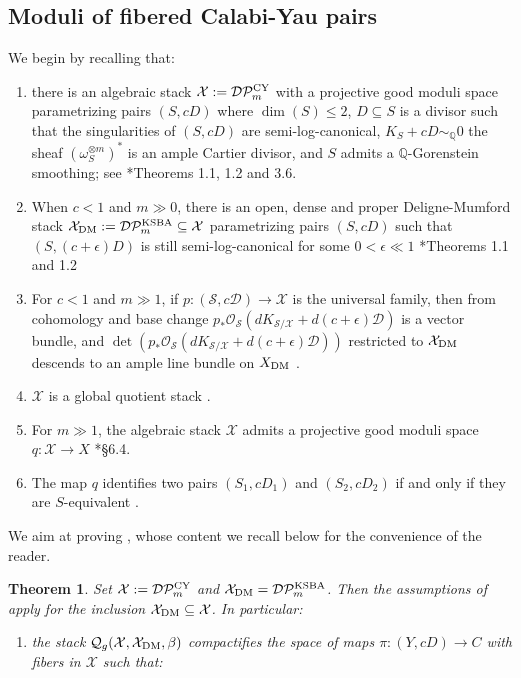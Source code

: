 \documentclass{amsart}
\newcommand{\bQ}{\mathbb{Q}}
\newcommand{\sD}{\mathscr{D}}
\newcommand{\sS}{\mathscr{S}}
\newcommand{\cD}{\mathcal{D}}
\newcommand{\cO}{\mathcal{O}}
\newcommand{\cP}{\mathcal{P}}
\newcommand{\cQ}{\mathcal{Q}}
\newcommand{\cS}{\mathcal{S}}
\newcommand{\cX}{\mathcal{X}}
\newcommand{\dm}{{\rm DM}}
\newcommand{\CY}{{\rm CY}}
\newtheorem{Teo}[theorem]{Theorem}
\theoremstyle{definition}
\theoremstyle{definition}
\begin{document}
{\subsection{Moduli of fibered Calabi-Yau pairs}
We begin by recalling that:
\begin{enumerate}
    \item there is an algebraic stack $\cX:=\cD\cP_m^{\CY}$ with a projective good moduli space parametrizing pairs $(S,cD)$ where $\dim(S)\le 2$, $D\subseteq S$ is a divisor such that the singularities of $(S,cD)$ are semi-log-canonical, $K_S+cD\sim_\mathbb{Q}0$ the sheaf $(\omega_S^{\otimes m})^{*}$ is an ample Cartier divisor, and $S$ admits a $\bQ$-Gorenstein smoothing; see \cite{blum2024good}*{Theorems 1.1, 1.2 and 3.6}.
    \item When $c<1$ and $m\gg 0$, there is an open, dense and proper Deligne-Mumford stack $\cX_\dm:=\cD\cP_m^{\operatorname{KSBA}}\subseteq \cX$ parametrizing pairs $(S,cD)$ such that $(S,(c+\epsilon)D)$ is still semi-log-canonical for some $0<\epsilon \ll 1$ \cite{blum2024good}*{Theorems 1.1 and 1.2}
    \item  For $c<1$ and $m\gg1$, if $p\colon(\sS,c\sD)\to \cX$ is the universal family, then from cohomology and base change $p_*\cO_\cS(d K_{\sS/\cX} + d(c+\epsilon)\sD)$ is a vector bundle, and $\det\left(p_*\cO_\sS(d K_{\cS/\cX} + d(c+\epsilon)\sD)\right)$ restricted to $\cX_\dm$ descends to an ample line bundle on $X_\dm$ \cite{KP17}.
    \item $\cX$ is a global quotient stack \cite{ascher2023moduli}.
    \item For $m\gg 1$, the algebraic stack $\cX$ admits a projective good moduli space $q:\cX\to X$ \cite{blum2024good}*{\S 6.4}.
    \item The map $q$ identifies two pairs $(S_1,cD_1)$ and $(S_2,cD_2)$ if and only if they are $S$-equivalent \cite{blum2024good}. 
\end{enumerate}
{We aim at proving , whose content we recall below for the convenience of the reader.
\begin{Teo}
    Set $\cX:=\cD\cP^{\CY}_m$ and $\cX_\dm=\cD\cP^{\operatorname{KSBA}}_m$. Then the assumptions of  apply for the inclusion $\cX_\dm\subseteq \cX$. In particular:
    \begin{enumerate}
        \item the stack $\cQ_g(\cX,\cX_\dm,\beta)$ compactifies the space of maps $\pi\colon(Y,cD)\to C$ with fibers in $\cX$ such that:

\end{enumerate}
\end{Teo}}}
\end{document}
